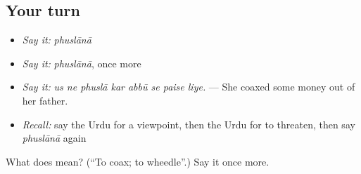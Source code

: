 \subsection*{Your turn}
\begin{itemize}
\raggedright
  \item \emph{Say it:} \emph{phuslānā}
  \item \emph{Say it:} \emph{phuslānā}, once more
  \item \emph{Say it:} \emph{us ne phuslā kar abbū se paise liye.} — She coaxed some money out of her father.
  \item \emph{Recall:} say the Urdu for a viewpoint, then the Urdu for to threaten, then say \emph{phuslānā} again
\end{itemize}

\begin{tcolorbox}[breakable,colback=teal!4,colframe=teal!35!black,title={Before you move on}]
What does  mean? (\textquotedblleft{}To coax; to wheedle\textquotedblright{}.) Say it once more.
\end{tcolorbox}
